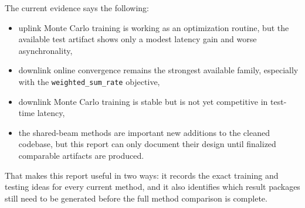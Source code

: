 \documentclass[11pt]{article}
\begin{document}
The current evidence says the following:
\begin{itemize}[leftmargin=1.5em]
    \item uplink Monte Carlo training is working as an optimization routine, but the available test artifact shows only a modest latency gain and worse asynchronality,
    \item downlink online convergence remains the strongest available family, especially with the \texttt{weighted\_sum\_rate} objective,
    \item downlink Monte Carlo training is stable but is not yet competitive in test-time latency,
    \item the shared-beam methods are important new additions to the cleaned codebase, but this report can only document their design until finalized comparable artifacts are produced.
\end{itemize}

That makes this report useful in two ways: it records the exact training and testing ideas for every current method, and it also identifies which result packages still need to be generated before the full method comparison is complete.
\end{document}
